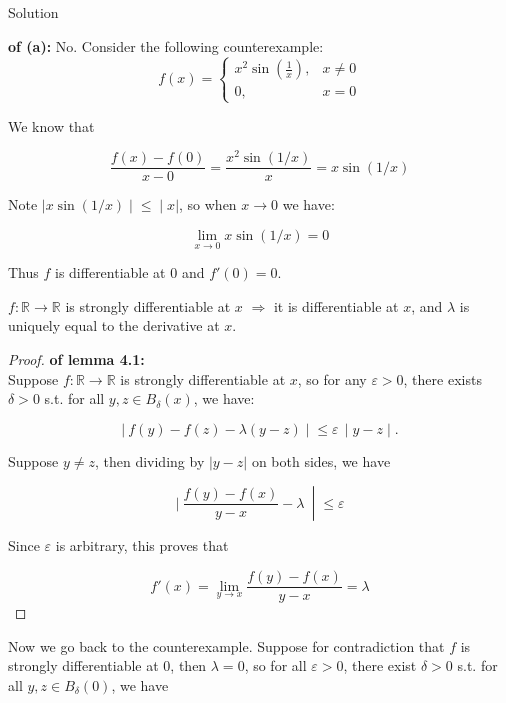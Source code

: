 \begin{qlsolution}{Solution}

\textbf{of (a):} No. Consider the following counterexample:\\

\[f(x) = \left\{ \begin{matrix}
{x^{2}\sin(\frac{1}{x}),} & {x \neq 0} \\
{0,} & {x = 0}
\end{matrix} \right.\]

We know that

\[\frac{f(x) - f(0)}{x - 0} = \frac{x^{2}\sin(1/x)}{x} = x\sin(1/x)\]

Note \(\left. |x\sin(1/x) \middle| \leq \middle| x| \right.\), so when \(x\rightarrow 0\) we have:

\[\lim\limits_{x\rightarrow 0}x\sin(1/x) = 0\]

Thus \(f\) is differentiable at \(0\) and \(f'(0) = 0\).

\begin{lemma}

\(f:\mathbb{R}\rightarrow\mathbb{R}\) is strongly differentiable at \(x\) \(\Longrightarrow\) it is differentiable at \(x\), and \(\lambda\) is uniquely equal to the derivative at \(x\).

\end{lemma}

\begin{proof}

\textbf{of lemma 4.1:}\\
Suppose \(f:\mathbb{R}\rightarrow\mathbb{R}\) is strongly differentiable at \(x\), so for any \(\varepsilon > 0\), there exists \(\delta > 0\) s.t. for all \(y,z \in B_{\delta}(x)\), we have:

\[\left. |\ f(y) - f(z) - \lambda(y - z) \middle| \leq \varepsilon\, \middle| y - z \middle| . \right.\]

Suppose \(y \neq z\), then dividing by \(|y - z|\) on both sides, we have

\[\left. |\ \frac{f(y) - f(x)}{y - x} - \lambda\  \middle| \leq \varepsilon \right.\]

Since \(\varepsilon\) is arbitrary, this proves that

\[f'(x) = \lim\limits_{y\rightarrow x}\frac{f(y) - f(x)}{y - x} = \lambda\]

\end{proof}

Now we go back to the counterexample. Suppose for contradiction that \(f\) is strongly differentiable at \(0\), then \(\lambda = 0\), so for all \(\varepsilon > 0\), there exist \(\delta > 0\) s.t. for all \(y,z \in B_{\delta}(0)\), we have


\end{qlsolution}
